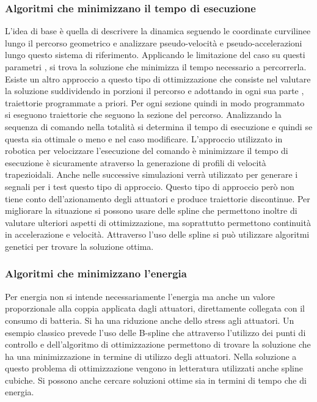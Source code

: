 \subsubsection{Algoritmi che minimizzano il tempo di esecuzione}

L'idea di base è quella di descrivere la dinamica seguendo le coordinate curvilinee lungo il percorso geometrico e analizzare pseudo-velocità e pseudo-accelerazioni lungo questo sistema di riferimento. Applicando le limitazione del caso su questi parametri , si trova la soluzione che minimizza il tempo necessario a percorrerla. Esiste un altro approccio a questo tipo di ottimizzazione che consiste nel valutare la soluzione suddividendo in porzioni il percorso e adottando in ogni sua parte , traiettorie programmate a priori. Per ogni sezione quindi in modo programmato si eseguono traiettorie che seguono la sezione del percorso. Analizzando la sequenza di comando nella totalità si determina il tempo di esecuzione e quindi se questa sia ottimale o meno e nel caso modificare. L'approccio utilizzato in robotica per velocizzare l'esecuzione del comando è minimizzare il tempo di esecuzione è sicuramente atraverso la generazione di profili di velocità trapezioidali. Anche nelle successive simulazioni verrà utilizzato per generare i segnali per i test questo tipo di approccio. Questo tipo di approccio però non tiene conto dell'azionamento degli attuatori e produce traiettorie discontinue. Per migliorare la situazione si possono usare delle spline che permettono inoltre di valutare ulteriori aspetti di ottimizzazione, ma soprattutto permettono continuità in accelerazione e velocità.
Attraverso l'uso delle spline si può utilizzare algoritmi genetici per trovare la soluzione ottima.

\subsubsection{Algoritmi che minimizzano l'energia}
Per energia non si intende necessariamente l'energia ma anche un valore proporzionale alla coppia applicata dagli attuatori, direttamente collegata con il consumo di batteria. Si ha una riduzione anche dello stress agli attuatori. Un esempio classico prevede l'uso delle B-spline che attraverso l'utilizzo dei punti di controllo e dell'algoritmo di ottimizzazione permettono di trovare la soluzione che ha una minimizzazione in termine di utilizzo degli attuatori. Nella soluzione a questo problema di ottimizzazione vengono in letteratura utilizzati anche spline cubiche. Si possono anche cercare soluzioni ottime sia in termini di tempo che di energia.


